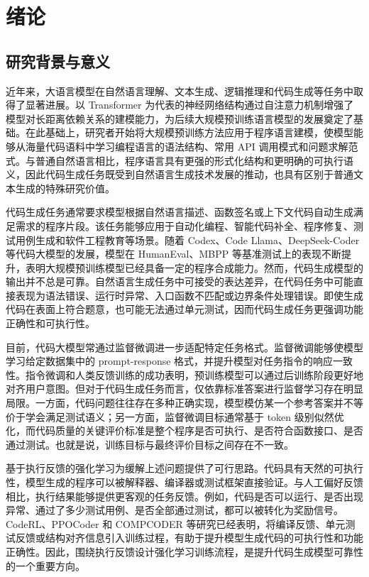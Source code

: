 
\chapter{绪论}

\section{研究背景与意义}

近年来，大语言模型在自然语言理解、文本生成、逻辑推理和代码生成等任务中取得了显著进展。以 Transformer 为代表的神经网络结构通过自注意力机制增强了模型对长距离依赖关系的建模能力，为后续大规模预训练语言模型的发展奠定了基础\cite{Vaswani2017Attention}。在此基础上，研究者开始将大规模预训练方法应用于程序语言建模，使模型能够从海量代码语料中学习编程语言的语法结构、常用 API 调用模式和问题求解范式。与普通自然语言相比，程序语言具有更强的形式化结构和更明确的可执行语义，因此代码生成任务既受到自然语言生成技术发展的推动，也具有区别于普通文本生成的特殊研究价值。

代码生成任务通常要求模型根据自然语言描述、函数签名或上下文代码自动生成满足需求的程序片段。该任务能够应用于自动化编程、智能代码补全、程序修复、测试用例生成和软件工程教育等场景。随着 Codex、Code Llama、DeepSeek-Coder 等代码大模型的发展，模型在 HumanEval、MBPP 等基准测试上的表现不断提升，表明大规模预训练模型已经具备一定的程序合成能力\cite{Chen2021Codex,Roziere2023CodeLlama,Guo2024DeepSeekCoder}。然而，代码生成模型的输出并不总是可靠。自然语言生成任务中可接受的表达差异，在代码任务中可能直接表现为语法错误、运行时异常、入口函数不匹配或边界条件处理错误。即使生成代码在表面上符合题意，也可能无法通过单元测试，因而代码生成任务更强调功能正确性和可执行性。

目前，代码大模型常通过监督微调进一步适配特定任务格式。监督微调能够使模型学习给定数据集中的 prompt-response 格式，并提升模型对任务指令的响应一致性。指令微调和人类反馈训练的成功表明，预训练模型可以通过后训练阶段更好地对齐用户意图\cite{Ouyang2022InstructGPT}。但对于代码生成任务而言，仅依靠标准答案进行监督学习存在明显局限。一方面，代码问题往往存在多种正确实现，模型模仿某一个参考答案并不等价于学会满足测试语义；另一方面，监督微调目标通常基于 token 级别似然优化，而代码质量的关键评价标准是整个程序是否可执行、是否符合函数接口、是否通过测试。也就是说，训练目标与最终评价目标之间存在不一致。

基于执行反馈的强化学习为缓解上述问题提供了可行思路。代码具有天然的可执行性，模型生成的程序可以被解释器、编译器或测试框架直接验证。与人工偏好反馈相比，执行结果能够提供更客观的任务反馈。例如，代码是否可以运行、是否出现异常、通过了多少测试用例、是否全部通过测试，都可以被转化为奖励信号。CodeRL、PPOCoder 和 COMPCODER 等研究已经表明，将编译反馈、单元测试反馈或结构对齐信息引入训练过程，有助于提升模型生成代码的可执行性和功能正确性\cite{Le2022CodeRL,Shojaee2023PPOCoder,Wang2022CompCoder}。因此，围绕执行反馈设计强化学习训练流程，是提升代码生成模型可靠性的一个重要方向。

